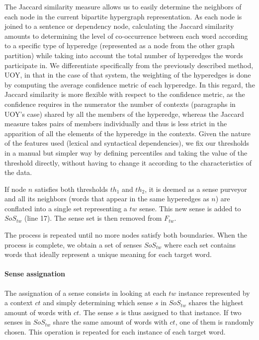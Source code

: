 The Jaccard similarity measure allows us to easily determine the neighbors of each node in the current bipartite hypergraph representation. As each node is joined to a sentence or dependency node, calculating the Jaccard similarity amounts to determining the level of co-occurrence between each word according to a specific type of hyperedge (represented as a node from the other graph partition) while taking into account the total number of hyperedges the words participate in. We differentiate specifically from the previously described method, UOY, in that in the case of that system, the weighting of the hyperedges is done by computing the average confidence metric of each hyperedge. In this regard, the Jaccard similarity is more flexible with respect to the confidence metric, as the confidence requires in the numerator the number of contexts (paragraphs in UOY's case) shared by all the members of the hyperedge, whereas the Jaccard measure takes pairs of members individually and thus is less strict in the apparition of all the elements of the hyperedge in the contexts. Given the nature of the features used (lexical and syntactical dependencies), we fix our thresholds in a manual but simpler way by defining percentiles and taking the value of the threshold directly, without having to change it according to the characteristics of the data.

If node $n$ satisfies both thresholds $th_1$ and $th_2$, it is deemed as a sense purveyor and all its neighbors (words that appear in the same hyperedges as $n$) are conflated into a single set representing a $tw$ sense. This new sense is added to $SoS_{tw}$ (line 17). The sense set is then removed from $F_{tw}$.

The process is repeated until no more nodes satisfy both boundaries. When the process is complete, we obtain a set of senses $SoS_{tw}$ where each set contains words that ideally represent a unique meaning for each target word. 

\paragraph{Sense assignation}

The assignation of a sense consists in looking at each $tw$ instance represented by a context $ct$ and simply determining which sense $s$ in $SoS_{tw}$ shares the highest amount of words with $ct$. The sense $s$ is thus assigned to that instance. If two senses in $SoS_{tw}$ share the same amount of words with $ct$, one of them is randomly chosen.  This operation is repeated for each instance of each target word. 


